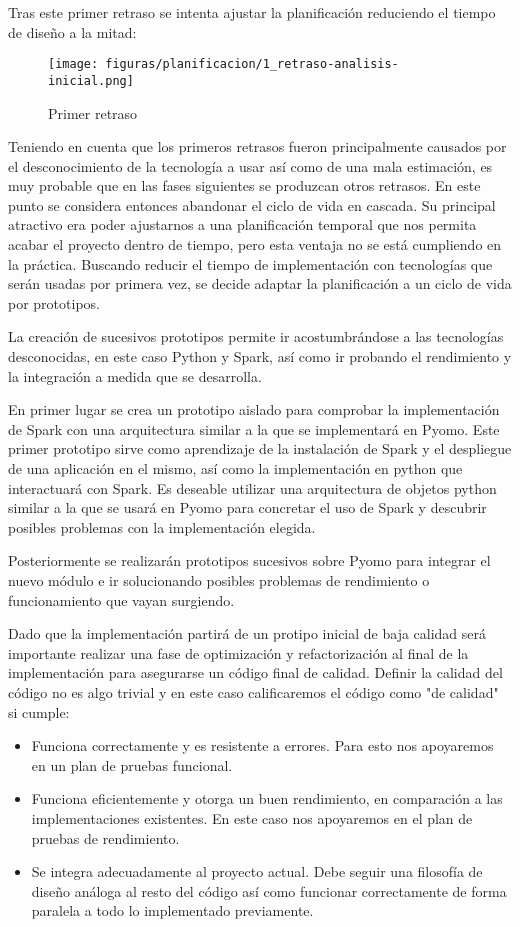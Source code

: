 Tras este primer retraso se intenta ajustar la planificación reduciendo el tiempo de diseño a la mitad:

\begin{figure}[H]
    \centerline{\texttt{[image: figuras/planificacion/1\_retraso-analisis-inicial.png]}}
    \caption{Primer retraso}
\end{figure}

Teniendo en cuenta que los primeros retrasos fueron principalmente causados por el desconocimiento de la tecnología a usar así como de una mala estimación, es muy probable que en las fases siguientes se produzcan otros retrasos. En este punto se considera entonces abandonar el ciclo de vida en cascada. Su principal atractivo era poder ajustarnos a una planificación temporal que nos permita acabar el proyecto dentro de tiempo, pero esta ventaja no se está cumpliendo en la práctica. Buscando reducir el tiempo de implementación con tecnologías que serán usadas por primera vez, se decide adaptar la planificación a un ciclo de vida por prototipos. 

La creación de sucesivos prototipos permite ir acostumbrándose a las tecnologías desconocidas, en este caso Python y Spark, así como ir probando el rendimiento y la integración a medida que se desarrolla.

En primer lugar se crea un prototipo aislado para comprobar la implementación de Spark con una arquitectura similar a la que se implementará en Pyomo. Este primer prototipo sirve como aprendizaje de la instalación de Spark y el despliegue de una aplicación en el mismo, así como la implementación en python que interactuará con Spark. Es deseable utilizar una arquitectura de objetos python similar a la que se usará en Pyomo para concretar el uso de Spark y descubrir posibles problemas con la implementación elegida.

Posteriormente se realizarán prototipos sucesivos sobre Pyomo para integrar el nuevo módulo e ir solucionando posibles problemas de rendimiento o funcionamiento que vayan surgiendo. 

Dado que la implementación partirá de un protipo inicial de baja calidad será importante realizar una fase de optimización y refactorización al final de la implementación para asegurarse un código final de calidad. Definir la calidad del código no es algo trivial y en este caso calificaremos el código como "de calidad" si cumple:

\begin{itemize}
    \item Funciona correctamente y es resistente a errores. Para esto nos apoyaremos en un plan de pruebas funcional.
    \item Funciona eficientemente y otorga un buen rendimiento, en comparación a las implementaciones existentes. En este caso nos apoyaremos en el plan de pruebas de rendimiento.
    \item Se integra adecuadamente al proyecto actual. Debe seguir una filosofía de diseño análoga al resto del código así como funcionar correctamente de forma paralela a todo lo implementado previamente.
\end{itemize}

